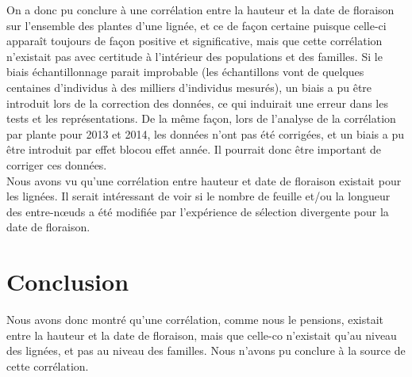 \documentclass[12pt,a4paper]{article}
\begin{document}
			 		On a donc pu conclure à une corrélation entre la hauteur et la date de floraison sur l'ensemble des plantes d'une lignée, et ce de façon certaine puisque celle-ci apparaît toujours de façon positive et significative, mais que cette corrélation n'existait pas avec certitude à l'intérieur des populations et des familles. Si le biais échantillonnage parait improbable (les échantillons vont de quelques centaines d'individus à des milliers d'individus mesurés), un biais a pu être introduit lors de la correction des données, ce qui induirait une erreur dans les tests et les représentations. De la même façon, lors de l'analyse de la corrélation par plante pour 2013 et 2014,  les données n'ont pas été corrigées, et un biais a pu être introduit par \og effet bloc\fg  ou \og effet année\fg. Il pourrait donc être important de corriger ces données.\\
			 		
			 		Nous avons vu qu'une corrélation entre hauteur et date de floraison existait pour les lignées. Il serait intéressant de voir si le nombre de feuille et/ou la longueur des entre-n\oe{}uds a été modifiée par l'expérience de sélection divergente pour la date de floraison.
			 		
			 	\section{Conclusion}
			 		
			 		Nous avons donc montré qu'une corrélation, comme nous le pensions, existait entre la hauteur et la date de floraison, mais que celle-co n'existait qu'au niveau des lignées, et pas au niveau des familles. Nous n'avons pu conclure à la source de cette corrélation.
	
	\newpage
			
	
	
	
	\newpage
	\appendix
		
\end{document}
